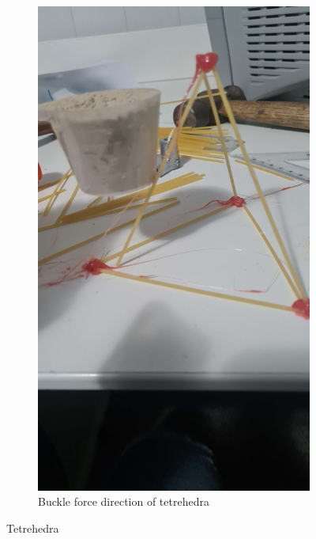 \documentclass{report}
\newcommand{\subimgw}{.7\linewidth}
\begin{document}
\begin{figure}[H]
\begin{subfigure}{.5\textwidth}
		\label{fig:tetrehedra:a}
	\end{subfigure}%
	\begin{subfigure}{.5\textwidth}
		\centering
		\includegraphics[width=\subimgw,trim={0 20cm 0 0},clip]{tetrehedra-b}
		\caption{Buckle force direction of tetrehedra}

		\label{fig:tetrehedra:untranslated}
	\end{subfigure}

	\caption{Tetrehedra}
	\label{fig:tetrehedra}
\end{figure}
\end{document}

